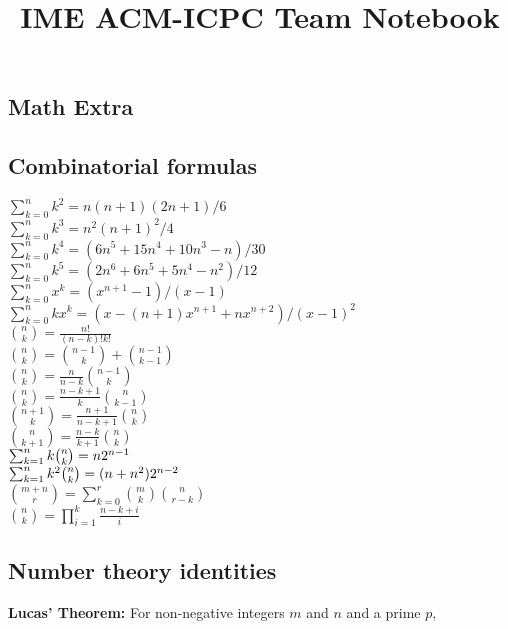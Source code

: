 \documentclass[a4paper,11pt]{article}
\title{\vspace{-4ex}\Large{IME ACM-ICPC Team Notebook}}
\author{}
\date{}
\begin{document}
\begin{landscape}
\begin{multicols}{2}

\maketitle
\vspace{-13ex}
\tableofcontents
\pagestyle{fancy}



\section{Math Extra}
\subsection{Combinatorial formulas}

 $\sum_{k=0}^{n}k^{2}=n(n+1)(2n+1)/6$\\
 $\sum_{k=0}^{n}k^{3}=n^{2}(n+1)^{2}/4$\\
 $\sum_{k=0}^{n}k^{4}=(6n^{5}+15n^{4}+10n^{3}-n)/30$\\
 $\sum_{k=0}^{n}k^{5}=(2n^{6}+6n^{5}+5n^{4}-n^{2})/12$\\
 $\sum_{k=0}^{n}x^{k}=(x^{n+1}-1)/(x-1)$\\
 $\sum_{k=0}^{n}kx^{k}=(x-(n+1)x^{n+1}+nx^{n+2})/(x-1)^{2}$\\
 ${n \choose k}=\frac{n!}{(n-k)!k!}$\\
 ${n \choose k}={n-1 \choose k}+{n-1 \choose k-1}$\\
 ${n \choose k}=\frac{n}{n-k}{n-1 \choose k}$\\
 ${n \choose k}=\frac{n-k+1}{k}{n \choose k-1}$\\
 ${n+1 \choose k}=\frac{n+1}{n-k+1}{n \choose k}$\\
 ${n \choose k+1}=\frac{n-k}{k+1}{n \choose k}$\\
 $\sum_{k=1}^{n}k\tbinom{n}{k}=n2^{n-1}$\\
 $\sum_{k=1}^{n}k^{2}\tbinom{n}{k}=(n+n^{2})2^{n-2}$\\
 ${m+n \choose r}=\sum_{k=0}^{r}{m \choose k}{n \choose r-k}$\\
 ${n \choose k}=\prod_{i=1}^{k}\frac{n-k+i}{i}$\\

\subsection{Number theory identities}
\textbf{Lucas' Theorem:} For non-negative integers $m$ and $n$ and a prime $p$,


\end{multicols}
\end{landscape}
\end{document}
